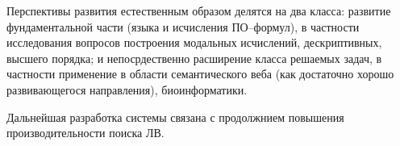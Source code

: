 

Перспективы развития естественным образом делятся на два класса: развитие фундаментальной части (языка и исчисления ПО--формул), в частности исследования вопросов построения модальных исчислений, дескриптивных, высшего порядка; и непосрдественно расширение класса решаемых задач, в частности применение в области семантического веба (как достаточно хорошо развивающегося направления), биоинформатики.

Дальнейшая разработка системы связана с продолжнием повышения производительности поиска ЛВ.



